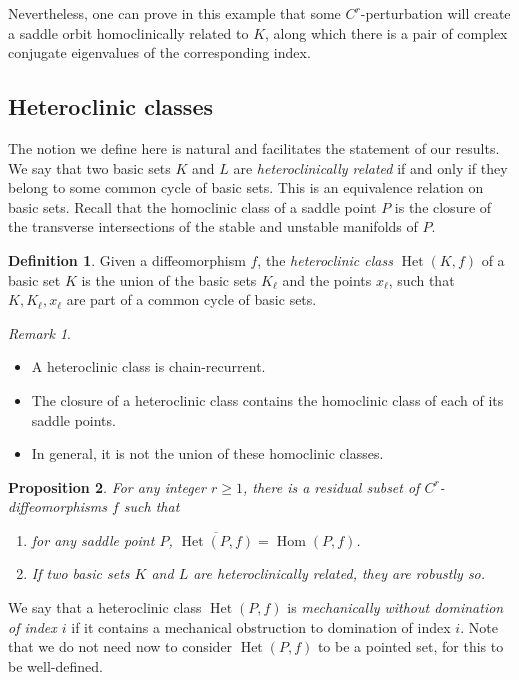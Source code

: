 \documentclass[11pt, a4paper]{amsart}
\theoremstyle{plain}
\newtheorem{proposition}{Proposition}[section]        %
\theoremstyle{definition}
\newtheorem{definition}{Definition}[proposition]
\theoremstyle{remark}
\newtheorem{remark}[proposition]{Remark}
\numberwithin{equation}{section}         %
\def\Het{\operatorname{Het}}
\def\Hom{\operatorname{Hom}}
\begin{document}
Nevertheless, one can prove in this example that some $C^r$-perturbation will create a saddle orbit homoclinically related to $K$, along which there is a pair of complex conjugate eigenvalues of the corresponding index. 

\subsection{Heteroclinic classes}\label{s.hetclas}
The notion we define here is natural and facilitates the statement of our results. 
We say that two basic sets $K$ and $L$ are {\em heteroclinically related} if and only if they belong to some common cycle of basic sets. This is an equivalence relation on basic sets. Recall that the homoclinic class of a saddle point $P$ is the closure of the transverse intersections of the stable and unstable manifolds of $P$. 


\begin{definition}
Given a diffeomorphism $f$, the {\em heteroclinic class} $\Het(K,f)$ of a basic set $K$ is the union of the basic sets $K_\ell$ and the points $x_\ell$, such that $K,K_\ell,x_\ell$ are part of a common cycle of basic sets.
\end{definition}

\begin{remark}
\begin{itemize}
\item A heteroclinic class is chain-recurrent.
\item The closure of a heteroclinic class contains the homoclinic class of each of its saddle points. 
\item In general, it is not the union of these homoclinic classes.
\end{itemize}
\end{remark}

\begin{proposition}\label{p.hethom}
 For any integer $r\geq 1$, there is a residual subset of $C^r$-diffeomorphisms $f$ such that 
\begin{enumerate}
\item for any saddle point $P$, $\overline{\Het(P,f)}=\Hom(P,f)$.\label{i.1}
\item If two basic sets $K$ and $L$ are heteroclinically related, they are robustly so.
\end{enumerate}
\end{proposition}

We say that a heteroclinic class $\Het(P,f)$ is {\em mechanically without domination of index $i$} if it contains a mechanical obstruction to domination of index $i$. Note that we do not need now to consider $\Het(P,f)$ to be a pointed set, for this to be well-defined. 
 
\end{document}
